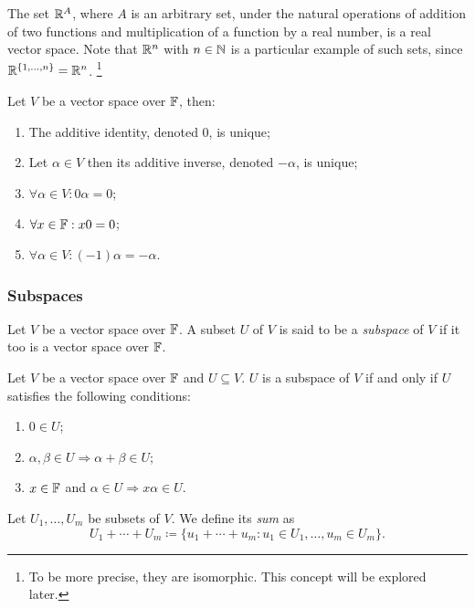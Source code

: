 \begin{example}
	The set $\mathbb{R}^A$, where $A$ is an arbitrary set, under the natural operations of addition of two functions and multiplication of a function by a real number, is a real vector space. Note that $\mathbb{R}^n$ with $n \in \mathbb{N}$ is a particular example of such sets, since $\mathbb{R}^{ \{ 1, \ldots, n \} } = \mathbb{R}^n$. \footnote{To be more precise, they are isomorphic. This concept will be explored later.}	
\end{example}

\begin{proposition}
Let $V$ be a vector space over $\mathbb{F}$, then:
\begin{enumerate}
	\item
		The additive identity, denoted $0$, is unique;
	\item Let $\alpha \in V$ then its additive inverse, denoted $-\alpha$, is unique;
	\item
		$\forall \alpha \in V : 0 \alpha = 0$;
	\item
		$\forall x \in \mathbb{F} : x0 = 0$;
	\item
		$\forall \alpha \in V : (-1) \alpha = - \alpha$.
\end{enumerate}
\end{proposition}

\subsubsection{Subspaces}
\begin{definition}
	Let $V$ be a vector space over $\mathbb{F}$. A subset $U$ of $V$ is said to be a \emph{subspace} of $V$ if it too is a vector space over $\mathbb{F}$.
\end{definition}

\begin{proposition}
	Let $V$ be a vector space over $\mathbb{F}$ and $U \subseteq V$. $U$ is a subspace of $V$ if and only if $U$ satisfies the following conditions:
	\begin{enumerate}
		\item
			$0 \in U$;
		\item
			$\alpha, \beta \in U \Rightarrow \alpha + \beta \in U$;
		\item
			$x \in \mathbb{F}$ and $\alpha \in U \Rightarrow x \alpha \in U$.
	\end{enumerate}
\end{proposition}

\begin{definition} 
	Let $U_1, \ldots, U_m$ be subsets of $V$. We define its \emph{sum} as
	\begin{equation*}
		U_1 + \cdots + U_m \coloneqq \{ u_1 + \cdots + u_m : u_1 \in U_1 , \ldots, u_m \in U_m \}. 
	\end{equation*}
\end{definition}
